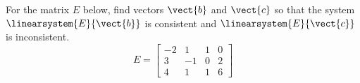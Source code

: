 For the matrix $E$ below, find vectors $\vect{b}$ and $\vect{c}$ so that the system $\linearsystem{E}{\vect{b}}$ is consistent and $\linearsystem{E}{\vect{c}}$ is inconsistent.
%
\begin{equation*}
E=
\begin{bmatrix}
-2 & 1 & 1 & 0\\
3 & -1 & 0 & 2\\
4 & 1 & 1 & 6
\end{bmatrix}
\end{equation*}
%